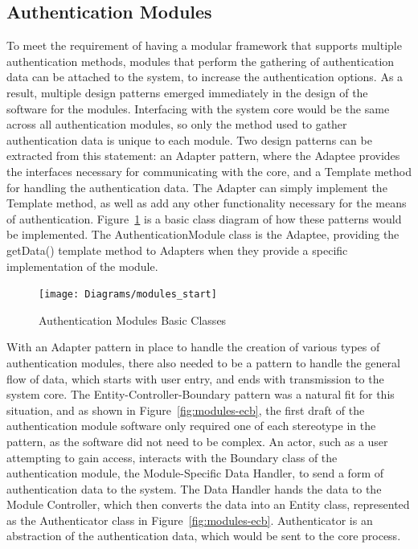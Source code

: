 \documentclass[12pt]{report}
\let\Oldsubsection\subsection
\renewcommand{\subsection}{\FloatBarrier\Oldsubsection}
\begin{document}

\subsection{Authentication Modules} \label{authentication-modules}

To meet the requirement of having a modular framework that supports multiple authentication methods, modules that 
perform the gathering of authentication data can be attached to the system, to increase the authentication options. As 
a result, multiple design patterns emerged immediately in the design of the software for the modules. Interfacing with 
the system core would be the same across all authentication modules, so only the method used to gather authentication 
data is unique to each module. Two design patterns can be extracted from this statement: an Adapter pattern, where the 
Adaptee provides the interfaces necessary for communicating with the core, and a Template method for handling the 
authentication data. The Adapter can simply implement the Template method, as well as add any other functionality 
necessary for the means of authentication. Figure~\ref{fig:modules-start} is a basic class diagram of how these 
patterns would be implemented. The AuthenticationModule class is the Adaptee, providing the getData() template method 
to Adapters when they provide a specific implementation of the module.

\begin{figure}
    \texttt{[image: Diagrams/modules\_start]}
    \caption{Authentication Modules Basic Classes}
    \label{fig:modules-start}
\end{figure}

With an Adapter pattern in place to handle the creation of various types of authentication modules, there also needed to 
be a pattern to handle the general flow of data, which starts with user entry, and ends with transmission to the system
core. The Entity-Controller-Boundary pattern was a natural fit for this situation, and as shown in 
Figure~\ref{fig:modules-ecb}, the first draft of the authentication module software only required one of each 
stereotype in the pattern, as the software did not need to be complex. An actor, such as a user attempting to gain 
access, interacts with the Boundary class of the authentication module, the Module-Specific Data Handler, to send a 
form of authentication data to the system. The Data Handler hands the data to the Module Controller, which then 
converts the data into an Entity class, represented as the Authenticator class in Figure~\ref{fig:modules-ecb}. 
Authenticator is an abstraction of the authentication data, which would be sent to the core process.
\end{document}
